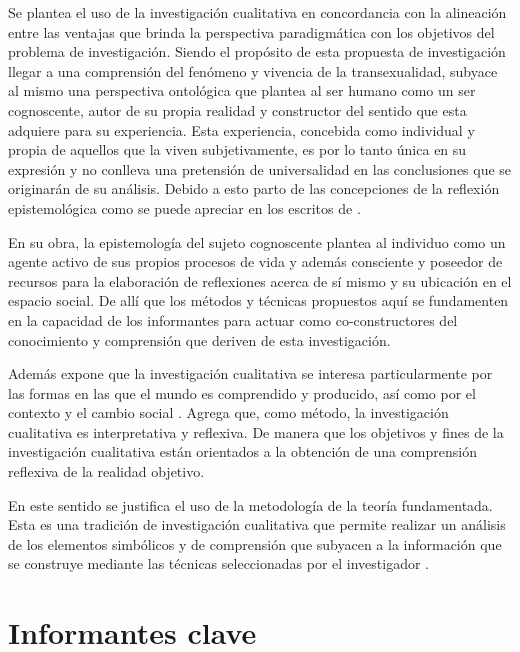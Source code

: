   Se plantea el uso de la investigación cualitativa en concordancia con la
alineación entre las ventajas que brinda la perspectiva paradigmática con los
objetivos del problema de investigación. Siendo el propósito de esta propuesta
de investigación llegar a una comprensión del fenómeno y vivencia de la
transexualidad, subyace al mismo una perspectiva ontológica que plantea al ser
humano como un ser cognoscente, autor de su propia realidad y constructor del
sentido que esta adquiere para su experiencia. Esta experiencia, concebida como
individual y propia de aquellos que la viven subjetivamente, es por lo tanto
única en su expresión y no conlleva una pretensión de universalidad
en las conclusiones que se originarán de su análisis. Debido a esto parto de
las concepciones de la reflexión epistemológica como se puede apreciar en los
escritos de \Textcite{Gialdino2009}.

  En su obra, la epistemología del sujeto cognoscente plantea al individuo como
un agente activo de sus propios procesos de vida y además consciente y poseedor
de recursos para la elaboración de reflexiones acerca de sí mismo y su
ubicación en el espacio social. De allí que los métodos y técnicas propuestos
aquí se fundamenten en la capacidad de los informantes para actuar como
co-constructores del conocimiento y comprensión que deriven de esta
investigación.

  Además expone que la investigación cualitativa se interesa particularmente por
las formas en las que el mundo es comprendido y producido, así como por el
contexto y el cambio social \parencite[Mason 1996, c.p.]{Gialdino2009}. Agrega
que, como método, la investigación cualitativa es interpretativa y reflexiva.
De manera que los objetivos y fines de la investigación cualitativa están
orientados a la obtención de una comprensión reflexiva de la realidad objetivo.


  En este sentido se justifica el uso de la metodología de la teoría fundamentada.
Esta es una tradición de investigación cualitativa que permite realizar un
análisis de los elementos simbólicos y de comprensión que subyacen a la
información que se construye mediante las técnicas seleccionadas por el
investigador \parencite{Glaser1967}.

\section{Informantes clave}

